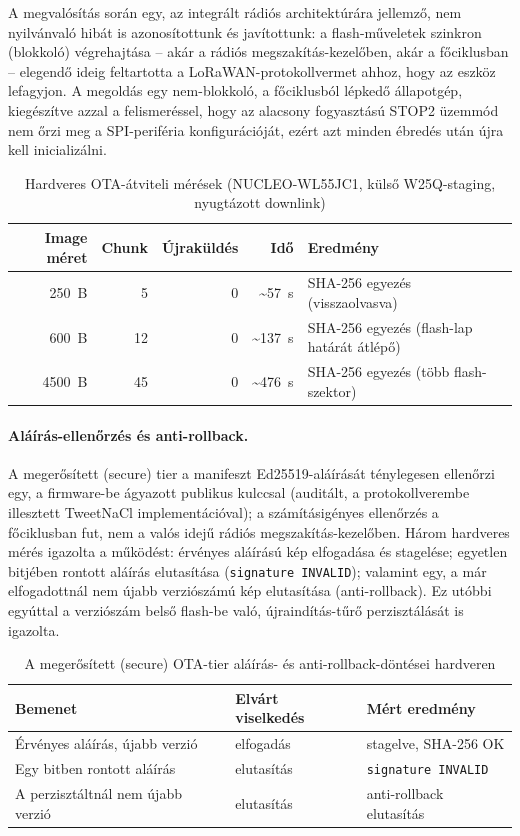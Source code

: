 \documentclass[12pt,a4paper]{article}
\begin{document}
A megvalósítás során egy, az integrált rádiós architektúrára jellemző, nem
nyilvánvaló hibát is azonosítottunk és javítottunk: a flash-műveletek szinkron
(blokkoló) végrehajtása -- akár a rádiós megszakítás-kezelőben, akár a
főciklusban -- elegendő ideig feltartotta a LoRaWAN-protokollvermet ahhoz, hogy
az eszköz lefagyjon. A megoldás egy nem-blokkoló, a főciklusból lépkedő
állapotgép, kiegészítve azzal a felismeréssel, hogy az alacsony fogyasztású
STOP2 üzemmód nem őrzi meg a SPI-periféria konfigurációját, ezért azt minden
ébredés után újra kell inicializálni.

\begin{table}[H]
\centering
\caption{Hardveres OTA-átviteli mérések (NUCLEO-WL55JC1, külső W25Q-staging, nyugtázott downlink)}
\begin{tabular}{rrrrl}
\toprule
Image méret & Chunk & Újraküldés & Idő & Eredmény \\
\midrule
250~B & 5 & 0 & \textasciitilde57~s & SHA-256 egyezés (visszaolvasva) \\
600~B & 12 & 0 & \textasciitilde137~s & SHA-256 egyezés (flash-lap határát átlépő) \\
4500~B & 45 & 0 & \textasciitilde476~s & SHA-256 egyezés (több flash-szektor) \\
\bottomrule
\end{tabular}
\end{table}

\paragraph{Aláírás-ellenőrzés és anti-rollback.} A megerősített (secure) tier a
manifeszt Ed25519-aláírását ténylegesen ellenőrzi egy, a firmware-be ágyazott
publikus kulccsal (auditált, a protokollverembe illesztett TweetNaCl
implementációval); a számításigényes ellenőrzés a főciklusban fut, nem a valós
idejű rádiós megszakítás-kezelőben. Három hardveres mérés igazolta a működést:
érvényes aláírású kép elfogadása és stagelése; egyetlen bitjében rontott aláírás
elutasítása (\texttt{signature INVALID}); valamint egy, a már elfogadottnál nem
újabb verziószámú kép elutasítása (anti-rollback). Ez utóbbi egyúttal a
verziószám belső flash-be való, újraindítás-tűrő perzisztálását is igazolta.

\begin{table}[H]
\centering
\caption{A megerősített (secure) OTA-tier aláírás- és anti-rollback-döntései hardveren}
\begin{tabular}{lll}
\toprule
Bemenet & Elvárt viselkedés & Mért eredmény \\
\midrule
Érvényes aláírás, újabb verzió & elfogadás & stagelve, SHA-256 OK \\
Egy bitben rontott aláírás & elutasítás & \texttt{signature INVALID} \\
A perzisztáltnál nem újabb verzió & elutasítás & anti-rollback elutasítás \\
\bottomrule
\end{tabular}
\end{table}
\end{document}

